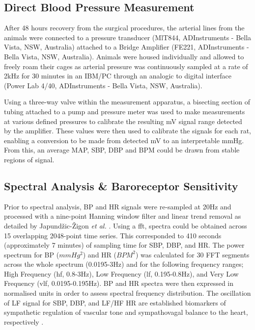 \subsection{Direct Blood Pressure Measurement}
After 48 hours recovery from the surgical procedures, the arterial lines from the animals were connected to a pressure transducer (MlT844, ADInstruments - Bella Vista, NSW, Australia) attached to a Bridge Amplifier (FE221, ADInstruments - Bella Vista, NSW, Australia). Animals were housed individually and allowed to freely roam their cages as arterial pressure was continuously sampled at a rate of 2kHz for 30 minutes in an IBM/PC through an analogic to digital interface (Power Lab 4/40, ADInstruments - Bella Vista, NSW, Australia).

Using a three-way valve within the measurement apparatus, a bisecting section of tubing attached to a pump and pressure meter was used to make measurements at various defined pressures to calibrate the resulting mV signal range detected by the amplifier. These values were then used to calibrate the signals for each rat, enabling a conversion to be made from detected mV to an interpretable mmHg. From this, an average MAP, SBP, DBP and BPM could be drawn from stable regions of signal.

\subsection{Spectral Analysis \& Baroreceptor Sensitivity}
Prior to spectral analysis, BP and HR signals were re-sampled at 20Hz and processed with a nine-point Hanning window filter and linear trend removal as detailed by Japundžic-Žigon \textit{et al.} \cite{Japundzic-Zigon2001}. Using a \acrfull{fft}, spectra could be obtained across 15 overlapping 2048-point time series. This corresponded to 410 seconds (approximately 7 minutes) of sampling time for SBP, DBP, and HR. The power spectrum for BP ($mmHg^{2}$) and HR ($BPM^{2}$) was calculated for 30 FFT segments across the whole spectrum (0.0195-3Hz) and for the following frequency ranges; High Frequency (\acrshort{hf}, 0.8-3Hz), Low Frequency (\acrshort{lf}, 0.195-0.8Hz), and Very Low Frequency (\acrshort{vlf}, 0.0195-0.195Hz). BP and HR spectra were then expressed in normalised units in order to assess spectral frequency distribution. The oscillation of LF signal for SBP, DBP, and LF/HF HR are established biomarkers of sympathetic regulation of vascular tone and sympathovagal balance to the heart, respectively \cite{Parati1995,taskforce}. 

